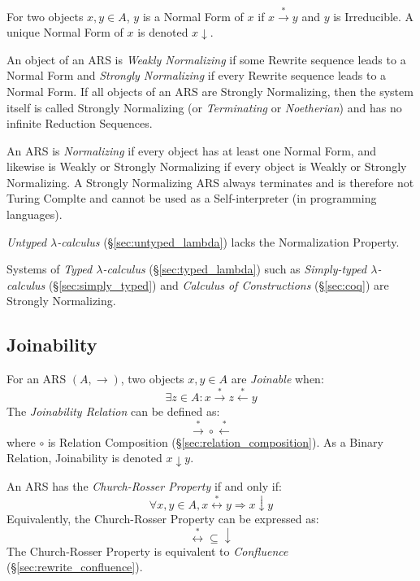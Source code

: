 For two objects $x,y \in A$, $y$ is a Normal Form of $x$ if $x
\stackrel{*}{\rightarrow} y$ and $y$ is Irreducible. A unique Normal
Form of $x$ is denoted $x \downarrow$.

An object of an ARS is \emph{Weakly Normalizing} if some Rewrite
sequence leads to a Normal Form and \emph{Strongly Normalizing} if
every Rewrite sequence leads to a Normal Form. If all objects of an
ARS are Strongly Normalizing, then the system itself is called
Strongly Normalizing (or \emph{Terminating} or \emph{Noetherian}) and
has no infinite Reduction Sequences.

An ARS is \emph{Normalizing} if every object has at least one Normal
Form, and likewise is Weakly or Strongly Normalizing if every object
is Weakly or Strongly Normalizing. A Strongly Normalizing ARS always
terminates and is therefore not Turing Complte and cannot be used as a
Self-interpreter (in programming languages).

\emph{Untyped $\lambda$-calculus} (\S\ref{sec:untyped_lambda}) lacks
the Normalization Property.

Systems of \emph{Typed $\lambda$-calculus} (\S\ref{sec:typed_lambda})
such as \emph{Simply-typed $\lambda$-calculus}
(\S\ref{sec:simply_typed}) and \emph{Calculus of Constructions}
(\S\ref{sec:coq}) are Strongly Normalizing.



\subsection{Joinability}\label{sec:rewrite_join}

For an ARS $(A, \rightarrow)$, two objects $x,y\in A$ are
\emph{Joinable} when:
\[
    \exists z \in A :
    x \stackrel{*}\rightarrow z \stackrel{*}\leftarrow y
\]
The \emph{Joinability Relation} can be defined as:
\[
    \stackrel{*}\rightarrow \circ \stackrel{*}\leftarrow
\]
where $\circ$ is Relation Composition
(\S\ref{sec:relation_composition}). As a Binary Relation, Joinability
is denoted $x \downarrow y$.

An ARS has the \emph{Church-Rosser Property} if and only if:
\[
    \forall x,y \in A, x \stackrel{*}\leftrightarrow y
    \Rightarrow x \downarrow y
\]
Equivalently, the Church-Rosser Property can be expressed as:
\[
    \stackrel{*}\leftrightarrow \subseteq \downarrow
\]
The Church-Rosser Property is equivalent to \emph{Confluence}
(\S\ref{sec:rewrite_confluence}).

